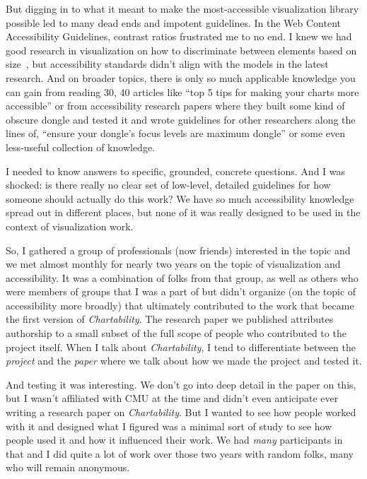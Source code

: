 \documentclass[12pt]{cmuthesis}
\begin{document}
But digging in to what it meant to make the most-accessible visualization library possible led to many dead ends and impotent guidelines. In the Web Content Accessibility Guidelines, contrast ratios frustrated me to no end. I knew we had good research in visualization on how to discriminate between elements based on size~\cite{Stone2014}, but accessibility standards didn't align with the models in the latest research. And on broader topics, there is only so much applicable knowledge you can gain from reading 30, 40 articles like ``top 5 tips for making your charts more accessible'' or from accessibility research papers where they built some kind of obscure dongle and tested it and wrote guidelines for other researchers along the lines of, ``ensure your dongle's focus levels are maximum dongle'' or some even less-useful collection of knowledge.

I needed to know answers to specific, grounded, concrete questions. And I was shocked: is there really no clear set of low-level, detailed guidelines for how someone should actually do this work? We have so much accessibility knowledge spread out in different places, but none of it was really designed to be used in the context of visualization work.

So, I gathered a group of professionals (now friends) interested in the topic and we met almost monthly for nearly two years on the topic of visualization and accessibility. It was a combination of folks from that group, as well as others who were members of groups that I was a part of but didn't organize (on the topic of accessibility more broadly) that ultimately contributed to the work that became the first version of \textit{Chartability}. The research paper we published attributes authorship to a small subset of the full scope of people who contributed to the project itself. When I talk about \textit{Chartability}, I tend to differentiate between the \textit{project} and the \textit{paper} where we talk about how we made the project and tested it.

And testing it was interesting. We don't go into deep detail in the paper on this, but I wasn't affiliated with CMU at the time and didn't even anticipate ever writing a research paper on \textit{Chartability}. But I wanted to see how people worked with it and designed what I figured was a minimal sort of study to see how people used it and how it influenced their work. We had \textit{many} participants in that and I did quite a lot of work over those two years with random folks, many who will remain anonymous.
\end{document}
